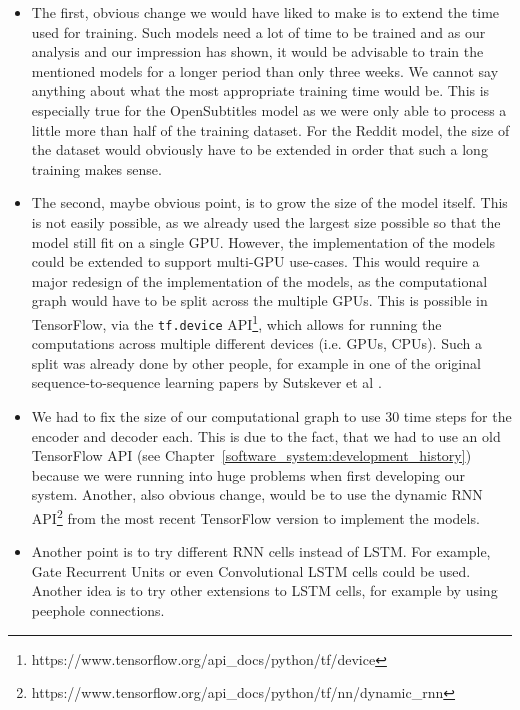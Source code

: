 \begin{itemize}
  \item The first, obvious change we would have liked to make is to extend the time used for training. Such models need a lot of time to be trained and as our analysis and our impression has shown, it would be advisable to train the mentioned models for a longer period than only three weeks. We cannot say anything about what the most appropriate training time would be. This is especially true for the OpenSubtitles model as we were only able to process a little more than half of the training dataset. For the Reddit model, the size of the dataset would obviously have to be extended in order that such a long training makes sense.
  
  \item The second, maybe obvious point, is to grow the size of the model itself. This is not easily possible, as we already used the largest size possible so that the model still fit on a single GPU. However, the implementation of the models could be extended to support multi-GPU use-cases. This would require a major redesign of the implementation of the models, as the computational graph would have to be split across the multiple GPUs. This is possible in TensorFlow, via the \texttt{tf.device} API\footnote{https://www.tensorflow.org/api\_docs/python/tf/device}, which allows for running the computations across multiple different devices (i.e. GPUs, CPUs). Such a split was already done by other people, for example in one of the original sequence-to-sequence learning papers by Sutskever et al \cite{Sutskever:2014}.

  \item We had to fix the size of our computational graph to use 30 time steps for the encoder and decoder each. This is due to the fact, that we had to use an old TensorFlow API (see Chapter~\ref{software_system:development_history}) because we were running into huge problems when first developing our system. Another, also obvious change, would be to use the dynamic RNN API\footnote{https://www.tensorflow.org/api\_docs/python/tf/nn/dynamic\_rnn} from the most recent TensorFlow version to implement the models.
  
  \item Another point is to try different RNN cells instead of LSTM. For example, Gate Recurrent Units \cite{Chung:2014} or even Convolutional LSTM \cite{Xingjian:2015} cells could be used. Another idea is to try other extensions to LSTM cells, for example by using peephole connections.


\end{itemize}
